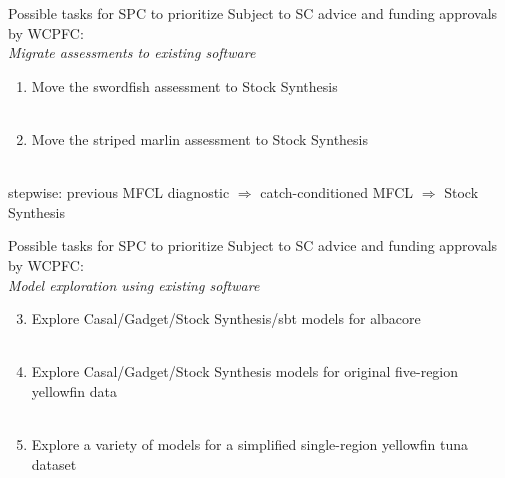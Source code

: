 \documentclass[aspectratio=169,fleqn]{beamer}
\begin{document}
\begin{frame}{Possible tasks for SPC to prioritize}
  Subject to SC advice and funding approvals by WCPFC:\\[4ex]
  {\orange\it Migrate assessments to existing software}\\[2ex]
  \begin{enumerate}
    \item Move the {\green swordfish} assessment to Stock Synthesis\\
    \\[3ex]
    \item Move the {\green striped marlin} assessment to Stock Synthesis\\
    \\[3ex]
  \end{enumerate}
  \gray stepwise: previous MFCL diagnostic $\Rightarrow$ catch-conditioned
  MFCL $\Rightarrow$ Stock Synthesis
\end{frame}


\begin{frame}{Possible tasks for SPC to prioritize}
  Subject to SC advice and funding approvals by WCPFC:\\[3.5ex]
  {\orange\it Model exploration using existing software}\\[2ex]
  \begin{enumerate}\setcounter{enumi}{2}
    \item Explore Casal/Gadget/Stock Synthesis/sbt models for {\green
      albacore}\\
    \\[3ex]
    \item Explore Casal/Gadget/Stock Synthesis models for original {\green
      five-region yellowfin} data\\
    \\[3ex]
    \item Explore a variety of models for a simplified {\green single-region
      yellowfin} tuna dataset\\
    \\[3ex]
  \end{enumerate}
\end{frame}
\end{document}
